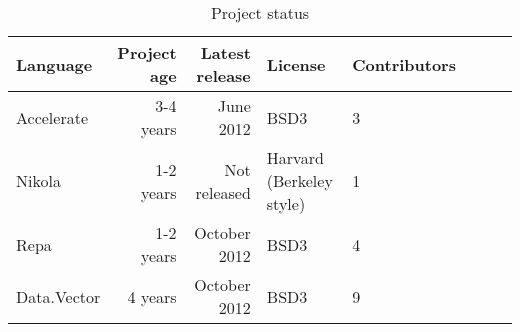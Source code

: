 \begin{table}
  \centering
\begin{adjustbox}{minipage=1.3\textwidth,margin=0pt \smallskipamount,center}
  \begin{tabular}{l|rrllllr}
    Language    & Project age & Latest release & License & Contributors \\ \hline
    Accelerate  & 3-4 years   & June 2012      & BSD3    & 3 \\
    Nikola      & 1-2 years   & Not released   & Harvard (Berkeley style) & 1 \\
    Repa        & 1-2 years   & October 2012   & BSD3    & 4 \\
    Data.Vector & 4 years     & October 2012   & BSD3    & 9 \\
  \end{tabular}
\end{adjustbox}
\caption{Project status}
\label{tab:project_status}
\end{table}










